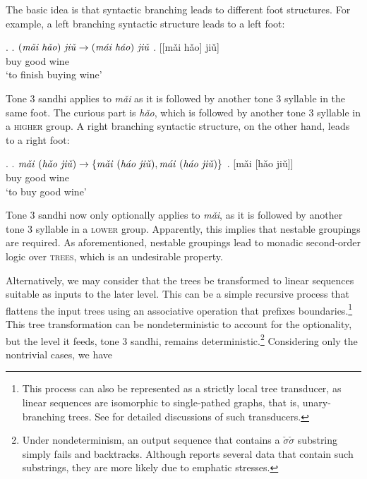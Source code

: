 \documentclass[12pt, a4paper]{report}
\newcommand{\textemph}[1]{\textsc{#1}}
\newcommand{\textform}[1]{\textit{#1}}
\newcommand{\textgls}[1]{`#1'}
\begin{document}
The basic idea is that syntactic branching leads to different foot
structures.  For example, a left branching syntactic structure leads
to a left foot:

\ex.
\a. \(\text{(\textform{mǎi hǎo}) \textform{jiǔ}} \to
\text{(\textform{mái háo}) \textform{jiǔ}}\)
\bg. [[mǎi hǎo] jiǔ]\\
\phantom{[[}buy good wine\\
\trans\textgls{to finish buying wine}

Tone 3 sandhi applies to \textform{mǎi} as it is followed by another
tone 3 syllable in the same foot.  The curious part is \textform{hǎo},
which is followed by another tone 3 syllable in a \textemph{higher}
group.  A right branching syntactic structure, on the other hand,
leads to a right foot:

\ex.
\a. \(\text{\textform{mǎi} (\textform{hǎo jiǔ})} \to
\{\text{\textform{mǎi} (\textform{háo jiǔ})},
\text{\textform{mái} (\textform{háo jiǔ})}\}\)
\bg. [mǎi [hǎo jiǔ]]\\
\phantom{[}buy \phantom{[}good wine\\
\trans\textgls{to buy good wine}

Tone 3 sandhi now only optionally applies to \textform{mǎi}, as it is
followed by another tone 3 syllable in a \textemph{lower} group.
Apparently, this implies that nestable groupings are required.  As
aforementioned, nestable groupings lead to monadic second-order logic
over \textemph{trees}, which is an undesirable property.

Alternatively, we may consider that the trees be transformed to linear
sequences suitable as inputs to the later level.  This can be a simple
recursive process that flattens the input trees using an associative
operation that prefixes boundaries.\footnote{This process can also be
  represented as a strictly local tree transducer, as linear sequences
  are isomorphic to single-pathed graphs, that is, unary-branching
  trees.  See \textcite{ioj20qtt, jh20isltt} for detailed discussions
  of such transducers.}  This tree transformation can be
nondeterministic to account for the optionality, but the level it
feeds, tone 3 sandhi, remains deterministic.\footnote{Under
  nondeterminism, an output sequence that contains a
  \(\check{\sigma}\check{\sigma}\) substring simply fails and
  backtracks.  Although \textcite{c00tspcd} reports several data that
  contain such substrings, they are more likely due to emphatic
  stresses.}  Considering only the nontrivial cases, we have
\end{document}
